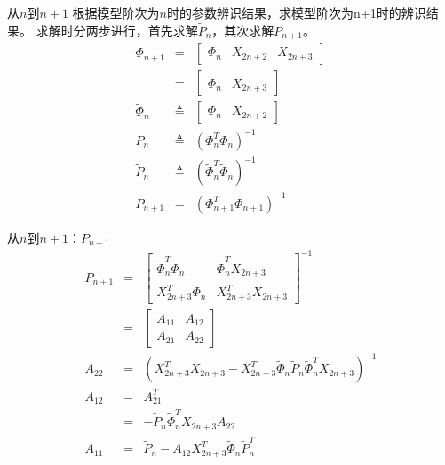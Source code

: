\begin{frame}{从$n$到$n+1$}
根据模型阶次为$n$时的参数辨识结果，求模型阶次为n+1时的辨识结果。
求解时分两步进行，首先求解$\tilde P_n$，其次求解$ P_{n+1}$。
\begin{eqnarray*}
\Phi_{n+1} &=& \begin{bmatrix} \Phi_{n} & X_{2n+2} & X_{2n+3} \end{bmatrix} \\
 &=& \begin{bmatrix} \tilde\Phi_{n} & X_{2n+3} \end{bmatrix} \\
\tilde\Phi_n &\triangleq& \begin{bmatrix} \Phi_{n} & X_{2n+2} \end{bmatrix}  \\
P_n &\triangleq& (\Phi_{n}^T\Phi_{n})^{-1} \\
\tilde{P}_n &\triangleq& (\tilde\Phi_{n}^T\tilde\Phi_{n})^{-1}  \\
P_{n+1} &=& (\Phi_{n+1}^T\Phi_{n+1})^{-1} 
\end{eqnarray*}
\end{frame}

\begin{frame}{从$n$到$n+1$：$P_{n+1}$}
\begin{eqnarray*}
P_{n+1} &=& 
\begin{bmatrix}
\tilde\Phi_n^T\tilde\Phi_n & \tilde\Phi_n^T X_{2n+3} \\
X_{2n+3}^T\tilde\Phi_n    & X_{2n+3}^T X_{2n+3}
\end{bmatrix}^{-1} \\
&=& \begin{bmatrix} A_{11} & A_{12} \\ A_{21} & A_{22} \end{bmatrix} \\
A_{22} &=& (X_{2n+3}^T X_{2n+3}-X_{2n+3}^T\tilde\Phi_n\tilde{P}_n\tilde\Phi_n^T X_{2n+3})^{-1} \\
A_{12} &=& A_{21}^T \\
&=& -\tilde{P}_n\tilde\Phi_n^T X_{2n+3} A_{22} \\
A_{11} &=& \tilde{P}_n- A_{12} X_{2n+3}^T\tilde\Phi_n \tilde{P}_n^T
\end{eqnarray*}
\end{frame}

